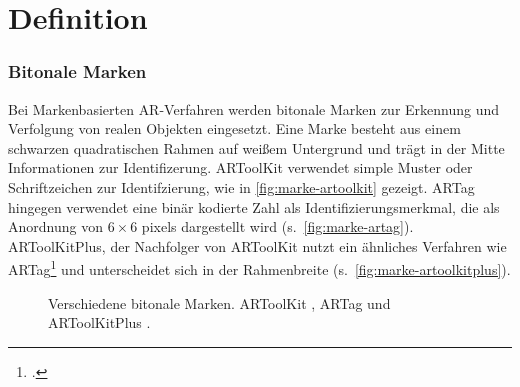 \section{Definition} %
\label{sec:definition}
\begin{comment}
	Definiere Begriffe der Augmented Reality und Bildverarbeitung, die dem Leser nicht geläufig sind. Denke dabei an Prof. Klocke als Leser ohne besonderen Kenntnisstand in der AR/Bildverarbeitung.
\end{comment}

\subsubsection{Bitonale Marken}
\label{sub:bitonalemarken}
Bei Markenbasierten \gls{AR}-Verfahren werden bitonale Marken zur Erkennung und Verfolgung von realen Objekten
 eingesetzt. Eine Marke besteht aus einem schwarzen quadratischen Rahmen auf weißem Untergrund und trägt in der Mitte
 Informationen zur Identifizerung. ARToolKit verwendet simple Muster oder Schriftzeichen zur Identifzierung, wie in
 \autoref{fig:marke-artoolkit} gezeigt. ARTag hingegen verwendet eine binär kodierte Zahl als Identifizierungsmerkmal,
 die als Anordnung von $6 \times 6$ \glspl{pixel} dargestellt wird (s.~\autoref{fig:marke-artag}). ARToolKitPlus, der
 Nachfolger von ARToolKit nutzt ein ähnliches Verfahren wie ARTag\footcite[Vgl.][S.~142]{wagner07b} und unterscheidet
 sich in der Rahmenbreite (s.~\autoref{fig:marke-artoolkitplus}).

\begin{figure}[!ht]
	\centering
	\caption{Verschiedene bitonale Marken.
		ARToolKit , ARTag  und ARToolKitPlus .
	}
	\label{fig:bitonale-marken}
\end{figure}

\begin{comment}
	(wagner/schmalstieg ARToolKitPlus fpr Pose Tracking on Mobile Devices S.4)

	Beim Fiducial Marker Tracking werden künstliche Marken zur Erkennung und Verfolgung von realen Objekten eingesetzt. Häufig werden für diese Marken quadratische schwarze Rahmen verwendet die innerhalb des Rahmens Schriftzeichen, Bilder oder 2D Codes enthalten. Diese Marken sind einfach herzustellen und können mit geringem Aufwand an Objekte angebracht werden.

	Diese bitonale Marken haben den Vorteil, dass sie Robust gegen Helligkeitsveränderung sind und die Entscheidung eines Pixels auf eine Schwellwert-Entscheidung reduziert werden kann. Marken für \gls{AR} müssen in einem großen Blickfeld erkannt werden können, was wiederum bei industriellen Anwendung nicht der Fall ist, da hier Marken den größten Teil des Bildes einnehmen können.
\end{comment}

